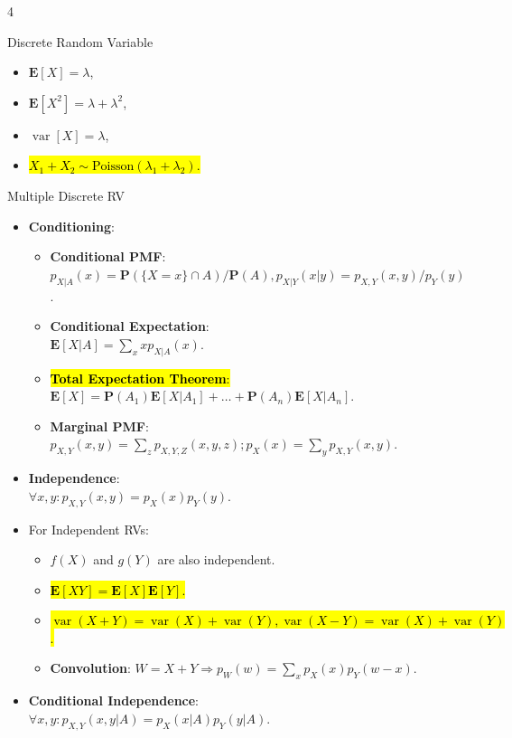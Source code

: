 \documentclass[landscape,a4paper]{article}
\renewcommand{\emph}[1]{\hl{#1}}
\newcommand{\PP}{\mathbf{P}}
\newcommand{\EE}{\mathbf{E}}
\newcommand{\var}{\operatorname{var}}
\begin{document}
\begin{multicols*}{4}
\begin{card}{Discrete Random Variable}
\begin{itemize}
\begin{itemize}
\begin{itemize}
						\item $\EE[X]=\lambda$,
						\item $\EE[X^2]=\lambda+\lambda^2$,
						\item $\var[X]=\lambda$,
						\item \emph{$X_1+X_2\sim\text{Poisson}(\lambda_1+\lambda_2)$.}
					\end{itemize}
				\end{itemize}
				\end{itemize}
			\end{card}
			\begin{card}{Multiple Discrete RV}
				\begin{itemize}
					\item \textbf{Conditioning}:
					\begin{itemize}
						\item \textbf{Conditional PMF}:\\ $p_{X|A}(x)=\PP(\{X=x\}\cap A)/\PP(A),p_{X|Y}(x|y)=p_{X,Y}(x,y)/p_Y(y)$.
						\item \textbf{Conditional Expectation}:\\ $\EE[X|A]=\sum_x xp_{X|A}(x)$.
						\item \emph{\textbf{Total Expectation Theorem}:}\\ $\EE[X]=\PP(A_1)\EE[X|A_1]+\dots +\PP(A_n)\EE[X|A_n]$.
						\item \textbf{Marginal PMF}:\\ $p_{X,Y}(x,y)=\sum_z p_{X,Y,Z}(x,y,z);p_X(x)=\sum_y p_{X,Y}(x,y)$.
					\end{itemize}
					\item \textbf{Independence}:\\ $\forall x,y\colon p_{X,Y}(x,y)=p_X(x)p_Y(y)$.
					\item For Independent RVs:
					\begin{itemize}
						\item $f(X)$ and $g(Y)$ are also independent.
						\item \emph{$\EE[XY]=\EE[X]\EE[Y]$.}
						\item \emph{$\var(X+Y)=\var(X)+\var(Y), \var(X-Y)=\var(X)+\var(Y)$.}
						\item \textbf{Convolution}: $W=X+Y\Rightarrow p_W(w)=\sum_xp_X(x)p_Y(w-x)$.
					\end{itemize}
					\item \textbf{Conditional Independence}:\\ $\forall x,y\colon p_{X,Y}(x,y|A)=p_X(x|A)p_Y(y|A)$.
				\end{itemize}

\end{card}
\end{multicols*}
\end{document}
